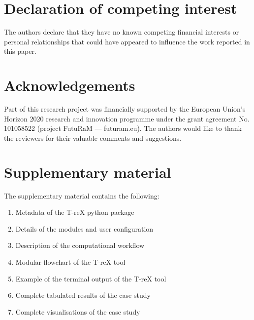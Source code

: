 \documentclass[review,3p,authoryear]{elsarticle}
\begin{document}
\section*{Declaration of competing interest}
The authors declare that they have no known competing financial interests or personal relationships that could have appeared to influence the work reported in this paper.

\section*{Acknowledgements}
    Part of this research project was financially supported by the European Union's Horizon 2020 research and innovation programme under the grant agreement No. 101058522 (project FutuRaM --- futuram.eu). The authors would like to thank the reviewers for their valuable comments and suggestions.

\section*{Supplementary material}
    The supplementary material contains the following:
    \begin{enumerate}
        \item Metadata of the T-reX python package
        \item Details of the modules and user configuration
        \item Description of the computational workflow
        \item Modular flowchart of the T-reX tool
        \item Example of the terminal output of the T-reX tool
        \item Complete tabulated results of the case study
        \item Complete visualisations of the case study
    \end{enumerate}



    


\end{document}
